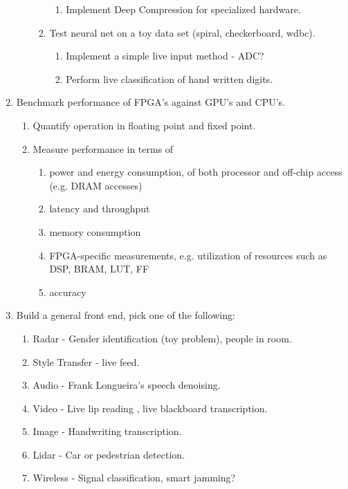 \documentclass[12pt]{article}
\begin{document}
\begin{enumerate}
\begin{enumerate}
\begin{enumerate}
\begin{enumerate}
            \item Implement Deep Compression for specialized hardware. \cite{DBLP:journals/corr/HanMD15}
          \end{enumerate}
        \item Test neural net on a toy data set (spiral, checkerboard, wdbc).\
          \begin{enumerate}
            \item Implement a simple live input method - ADC?
            \item Perform live classification of hand written digits.
          \end{enumerate}
      \end{enumerate}
    \end{enumerate}
  \item Benchmark performance of FPGA's against GPU's and CPU's.
    \begin{enumerate}
      \item Quantify operation in floating point and fixed point.
      \item Measure performance in terms of 
          \begin{enumerate}
              \item power and energy consumption, of both processor and off-chip access (e.g. DRAM accesses)
              \item latency and throughput
              \item memory consumption
              \item FPGA-specific measurements, e.g. utilization of resources such as DSP, BRAM,  LUT, FF
              \item accuracy
          \end{enumerate}
    \end{enumerate}
  \item Build a general front end, pick one of the following:
    \begin{enumerate}
      \item Radar - Gender identification (toy problem), people in room.
      \item Style Transfer - live feed.
      \item Audio - Frank Longueira's speech denoising.
      \item Video - Live lip reading \cite{DBLP:journals/corr/AssaelSWF16}, live blackboard transcription.
      \item Image - Handwriting transcription.
      \item Lidar - Car or pedestrian detection.
      \item Wireless - Signal classification, smart jamming?
    \end{enumerate}
  \end{enumerate}
  


\end{document}
